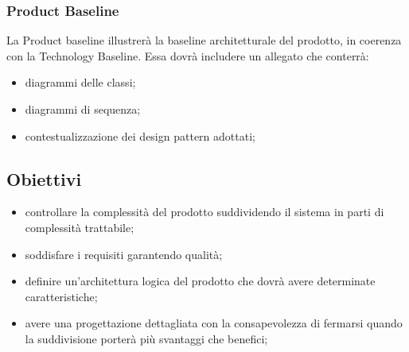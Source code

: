 \documentclass{article}
\begin{document}
	\subsubsection{Product Baseline}
	La Product baseline illustrerà la baseline architetturale del prodotto, in coerenza con la Technology Baseline.
	Essa dovrà includere un allegato che conterrà:
	\begin{itemize}
		\item	diagrammi delle classi;
		\item	diagrammi di sequenza;
		\item	contestualizzazione dei design pattern adottati;	
	\end{itemize}

\subsection{Obiettivi}
\begin{itemize}
	\item controllare la complessità del prodotto suddividendo il sistema in parti di complessità trattabile;
	\item soddisfare i requisiti garantendo qualità;
	\item definire un’architettura logica del prodotto che dovrà avere determinate caratteristiche;
	\item avere una progettazione dettagliata con la consapevolezza di fermarsi quando la suddivisione porterà più svantaggi che benefici;
\end{itemize}
\end{document}
